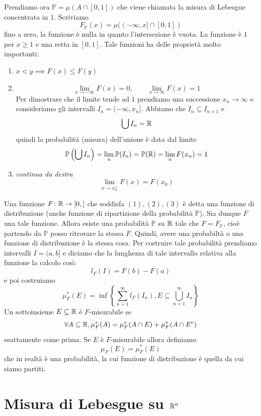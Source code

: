 \documentclass[a4paper]{article}
\begin{document}
Prendiamo ora \(\mathbb{P} = \mu(A \cap [0,1])\) che viene chiamata la misura di Lebesgue concentrata in \(1\).
Scriviamo
\[
    F_{\mathbb{P}}(x) = \mu((-\infty, x] \cap [0,1])
\]
fino a zero, la funzione è nulla in quanto l'intersezione è vuota.
La funzione è \(1\) per \(x\geq1\) e una retta in \([0,1]\).
Tale funzioni ha delle proprietà molto importanti:
\begin{enumerate}
    \item \(x<y \implies F(x) \leq F(y)\)
    \item \[
        \lim_{x\to-\infty} F(x) = 0,\qquad \lim_{x\to\infty} F(x) = 1
    \]
    Per dimostrare che il limite tende ad \(1\) prendiamo una successione \(x_n \to \infty\) e consideriamo
    gli intervalli \(I_n = (-\infty, x_n]\).
    Abbiamo che \(I_n \subseteq I_{n+1}\) e
    \[
        \bigcup I_n = \mathbb{R}
    \]
    quindi la probabilità (misura) dell'unione è data dal limite
    \[
        \mathbb{P} \left(
            \bigcup I_n
        \right) = \lim_n \mathbb{P}(I_n) = \mathbb{P}(\mathbb{R})
        = \lim_n F(x_n) = 1
    \]
    \item \emph{continua da destra} \[
        \lim_{x\to x_0^+} F(x) = F(x_0)
    \]
\end{enumerate}

Una funzione \(F \colon \mathbb{R} \to [0,]\) che soddisfa \((1), (2), (3)\) è detta
una funzione di distribuzione (anche funzione di ripartizione della probabilità \(\mathbb{P}\)).
Sia dunque \(F\) una tale funzione. Allora esiste una probabilità \(\mathbb{P}\) su \(\mathbb{R}\)
tale che \(F = F_{\mathbb{P}}\), cioè partendo da \(\mathbb{P}\) posso ritrovare la stessa \(F\).
Quindi, avere una probabiltà o una funzione di distribuzione è la stessa cosa.
Per costruire tale probabilità prendiamo intervalli \(I = (a, b]\) e diciamo che la lunghezza
di tale intervallo relativa alla funzione la calcolo così:
\[
    l_F(I) = F(b) - F(a)
\]
e poi costruiamo
\[
    \mu^*_F(E) = \inf\left\{
        \sum_{n=1}^\infty l_F(I_n), E \subseteq \bigcup_{n=1}^\infty I_n
    \right\}
\]
Un sottoinsieme \(E \subseteq \mathbb{R}\) è \(F\)-misurabile
se
\[
    \forall A \subseteq \mathbb{R}, \mu_F^*(A) = \mu_F^*(A \cap E) + \mu^*_F(A \cap E^c)
\]
esattamente come prima.
Se \(E\) è \(F\)-misurabile allora definiamo
\[
    \mu_F(E) = \mu_F^*(E)
\]
che in realtà è una probabilità, la cui funzione di distribuzione è quella da cui siamo partiti.

\section{Misura di Lebesgue su \(\mathbb{R}^n\)}
\end{document}
